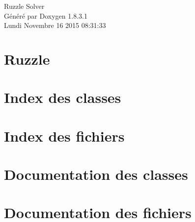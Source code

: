 \documentclass{book}
\begin{document}
\hypersetup{pageanchor=false,citecolor=blue}
\begin{titlepage}
\vspace*{7cm}
\begin{center}
{\Large Ruzzle Solver }\\
\vspace*{1cm}
{\large Généré par Doxygen 1.8.3.1}\\
\vspace*{0.5cm}
{\small Lundi Novembre 16 2015 08:31:33}\\
\end{center}
\end{titlepage}
\clearemptydoublepage
{}
\tableofcontents
\clearemptydoublepage
{}
\hypersetup{pageanchor=true,citecolor=blue}
\chapter{Ruzzle}
\label{md_LISEZ_MOI}
\hypertarget{md_LISEZ_MOI}{}

\chapter{Index des classes}

\chapter{Index des fichiers}

\chapter{Documentation des classes}



\chapter{Documentation des fichiers}













\printindex
\end{document}
